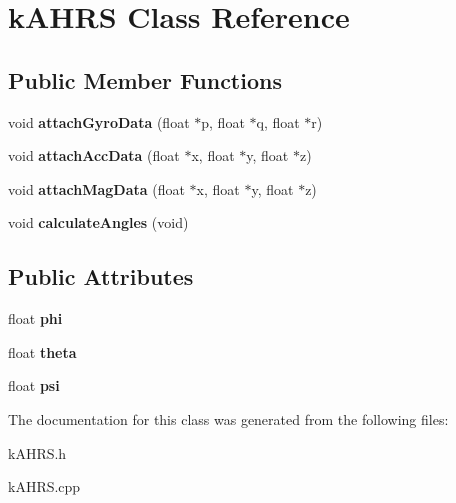 \hypertarget{classkAHRS}{}\section{k\+A\+H\+RS Class Reference}
\label{classkAHRS}
\subsection*{Public Member Functions}
\begin{DoxyCompactItemize}
\item 
void {\bfseries attach\+Gyro\+Data} (float $\ast$p, float $\ast$q, float $\ast$r)\hypertarget{classkAHRS_a00aa79c6f87c89cebc2f6586b9ceddc7}{}\label{classkAHRS_a00aa79c6f87c89cebc2f6586b9ceddc7}

\item 
void {\bfseries attach\+Acc\+Data} (float $\ast$x, float $\ast$y, float $\ast$z)\hypertarget{classkAHRS_ad8eb2d8d58f1c5bd13597080bd739cf2}{}\label{classkAHRS_ad8eb2d8d58f1c5bd13597080bd739cf2}

\item 
void {\bfseries attach\+Mag\+Data} (float $\ast$x, float $\ast$y, float $\ast$z)\hypertarget{classkAHRS_a9cba76a76b4c2dd5dca7da063c581c7b}{}\label{classkAHRS_a9cba76a76b4c2dd5dca7da063c581c7b}

\item 
void {\bfseries calculate\+Angles} (void)\hypertarget{classkAHRS_a61848c7fe9487653f1a974ad907932f7}{}\label{classkAHRS_a61848c7fe9487653f1a974ad907932f7}

\end{DoxyCompactItemize}
\subsection*{Public Attributes}
\begin{DoxyCompactItemize}
\item 
float {\bfseries phi}\hypertarget{classkAHRS_a537bb49f1d1859303580e2cdc8001d7b}{}\label{classkAHRS_a537bb49f1d1859303580e2cdc8001d7b}

\item 
float {\bfseries theta}\hypertarget{classkAHRS_a43c3550d28d59dfb2f1c2cd52d67ce02}{}\label{classkAHRS_a43c3550d28d59dfb2f1c2cd52d67ce02}

\item 
float {\bfseries psi}\hypertarget{classkAHRS_aac92d012a193f09ee2b80d6016a7def5}{}\label{classkAHRS_aac92d012a193f09ee2b80d6016a7def5}

\end{DoxyCompactItemize}


The documentation for this class was generated from the following files\+:\begin{DoxyCompactItemize}
\item 
k\+A\+H\+R\+S.\+h\item 
k\+A\+H\+R\+S.\+cpp\end{DoxyCompactItemize}

